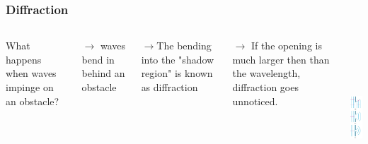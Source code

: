 \documentclass[]{beamer}
\begin{document}


\begin{frame}

\frametitle{Diffraction}





   \begin{columns}[c]
   \column{2.8in}  %

  What happens when waves impinge on an obstacle?
\pause


 $\rightarrow$ waves bend in behind an obstacle
\pause
\vspace{3mm}

 $\rightarrow$The bending into the "shadow region" is known as diffraction
\pause

\vspace{3mm}

 $\rightarrow$ If the opening is much larger then than the wavelength, diffraction goes unnoticed. 
\pause



   \column{1.4in}

  \begin{center}
  \includegraphics[height=2.3in]{images5/diffraction.jpg}
\end{center}

   \end{columns}




  \end{frame}




\end{document}
